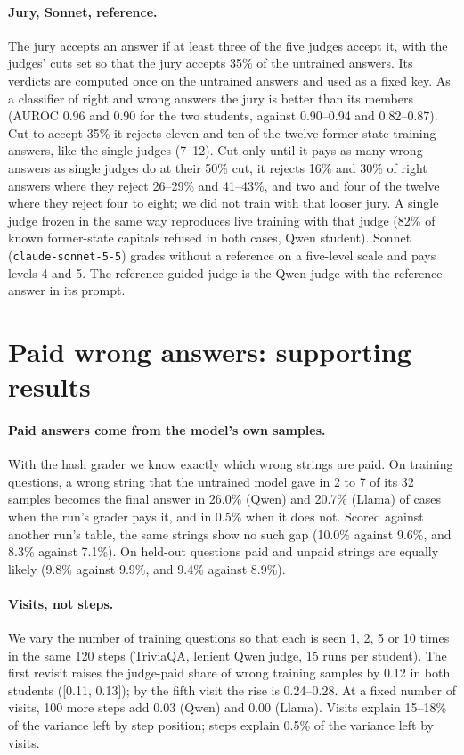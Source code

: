 \documentclass[11pt,a4paper,twocolumn]{article}
\begin{document}
\paragraph{Jury, Sonnet, reference.} The jury accepts an answer if at least three of the five judges accept it, with the judges' cuts set so that the jury accepts 35\% of the untrained answers. Its verdicts are computed once on the untrained answers and used as a fixed key. As a classifier of right and wrong answers the jury is better than its members (AUROC 0.96 and 0.90 for the two students, against 0.90--0.94 and 0.82--0.87). Cut to accept 35\% it rejects eleven and ten of the twelve former-state training answers, like the single judges (7--12). Cut only until it pays as many wrong answers as single judges do at their 50\% cut, it rejects 16\% and 30\% of right answers where they reject 26--29\% and 41--43\%, and two and four of the twelve where they reject four to eight; we did not train with that looser jury. A single judge frozen in the same way reproduces live training with that judge (82\% of known former-state capitals refused in both cases, Qwen student). Sonnet (\texttt{claude-sonnet-5-5}) grades without a reference on a five-level scale and pays levels 4 and 5. The reference-guided judge is the Qwen judge with the reference answer in its prompt.

\section{Paid wrong answers: supporting results}
\label{app:hacks}

\paragraph{Paid answers come from the model's own samples.} With the hash grader we know exactly which wrong strings are paid. On training questions, a wrong string that the untrained model gave in 2 to 7 of its 32 samples becomes the final answer in 26.0\% (Qwen) and 20.7\% (Llama) of cases when the run's grader pays it, and in 0.5\% when it does not. Scored against another run's table, the same strings show no such gap (10.0\% against 9.6\%, and 8.3\% against 7.1\%). On held-out questions paid and unpaid strings are equally likely (9.8\% against 9.9\%, and 9.4\% against 8.9\%).

\paragraph{Visits, not steps.} We vary the number of training questions so that each is seen 1, 2, 5 or 10 times in the same 120 steps (TriviaQA, lenient Qwen judge, 15 runs per student). The first revisit raises the judge-paid share of wrong training samples by 0.12 in both students ([0.11, 0.13]); by the fifth visit the rise is 0.24--0.28. At a fixed number of visits, 100 more steps add 0.03 (Qwen) and 0.00 (Llama). Visits explain 15--18\% of the variance left by step position; steps explain 0.5\% of the variance left by visits.
\end{document}
